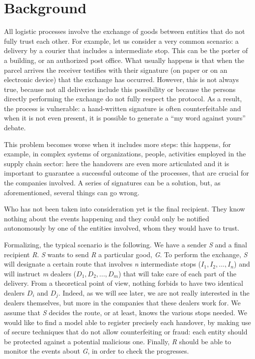\chapter{Background}
\label{cha:background}

All logistic processes involve the exchange of goods between entities that do not fully trust each other. For example, let us consider a very common scenario: a delivery by a courier that includes a intermediate stop. This can be the porter of a building, or an authorized post office. What usually happens is that when the parcel arrives the receiver testifies with their signature (on paper or on an electronic device) that the exchange has occurred. However, this is not always true, because not all deliveries include this possibility or because the persons directly performing the exchange do not fully respect the protocol. As a result, the process is vulnerable: a hand-written signature is often counterfeitable and when it is not even present, it is possible to generate a ``my word against yours'' debate.

This problem becomes worse when it includes more steps: this happens, for example, in complex systems of organizations, people, activities employed in the supply chain sector: here the handovers are even more articulated and it is important to guarantee a successful outcome of the processes, that are crucial for the companies involved. A series of signatures can be a solution, but, as aforementioned, several things can go wrong.

Who has not been taken into consideration yet is the final recipient. They know nothing about the events happening and they could only be notified autonomously by one of the entities involved, whom they would have to trust. 

Formalizing, the typical scenario is the following. We have a sender \textit{S} and a final recipient \textit{R}. \textit{S} wants to send \textit{R} a particular good, \textit{G}. To perform the exchange, \textit{S} will designate a certain route that involves \textit{n} intermediate stops ($I_1, I_2, ..., I_n$) and will instruct \textit{m} dealers ($D_1, D_2, ..., D_m$) that will take care of each part of the delivery. From a theoretical point of view, nothing forbids to have two identical dealers $D_i$ and $D_j$. Indeed, as we will see later, we are not really interested in the dealers themselves, but more in the companies that these dealers work for. We assume that \textit{S} decides the route, or at least, knows the various stops needed. We would like to find a model able to register precisely each handover, by making use of secure techniques that do not allow counterfeiting or fraud: each entity should be protected against a potential malicious one. Finally, \textit{R} should be able to monitor the events about \textit{G}, in order to check the progresses.

